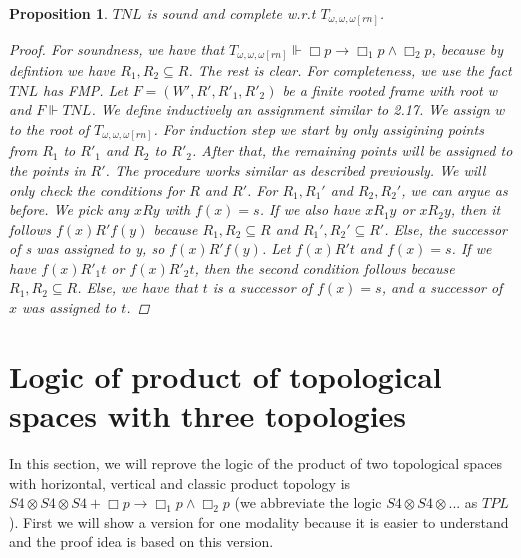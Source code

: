 \documentclass[12pt, a4paper]{scrartcl}
\newtheorem{proposition}[definition]{Proposition}
\begin{document}
\begin{proposition}
    $\mathit{TNL}$ is sound and complete w.r.t $T_{\omega,\omega,\omega[rn]}$.

    \begin{proof}
    For soundness, we have that $T_{\omega,\omega,\omega[rn]} \Vdash \Box p \rightarrow \Box_1 p \land \Box_2p$, because by defintion we have $R_1,R_2 \subseteq R$. The rest is clear.
    For completeness, we use the fact $\mathit{TNL}$ has FMP. Let $F = (W',R', R'_1, R'_2)$ be a finite rooted frame with root w and $F \Vdash TNL$. We define inductively an
    assignment similar to 2.17. We assign $w$ to the root of $T_{\omega,\omega,\omega[rn]}$. For induction step we start by only assigining points from $R_1$ to $R'_1$ and $R_2$ to $R'_2$. After that, the remaining points will be assigned to the points in $R'$.
    The procedure works similar as described previously. \newline
    We will only check the conditions for $R$ and $R'$. For $R_1, R_1'$ and $R_2, R_2'$, we can argue as before. We pick any $xRy$ with $f(x) = s$. 
    If we also have $xR_1y$ or $xR_2y$, then it follows $f(x)R' f(y)$ because $R_1, R_2 \subseteq R$ and $R_1', R_2' \subseteq R'$. Else, the successor of s was assigned to y, so $f(x)R'f(y)$. \newline
    Let $f(x)R't$ and $f(x) = s$. If we have $f(x) R'_1 t$ or $f(x) R'_2 t$, then the second condition follows because $R_1,R_2 \subseteq R$.
    Else, we have that $t$ is a successor of $f(x) = s$, and a successor of $x$ was assigned to $t$.
    \end{proof}
        
\end{proposition}




\clearpage

\section{Logic of product of topological spaces with three topologies}
In this section, we will reprove the logic of the product of two topological spaces with horizontal, vertical and classic product topology is 
$S4 \otimes S4 \otimes S4 + \Box p \rightarrow \Box_1 p \land \Box_2 p$ (we abbreviate the logic $S4 \otimes S4 \otimes ...$ as $\mathit{TPL}$). First we will show a version for one modality
because it is easier to understand and the proof idea is based on this version.
\end{document}
